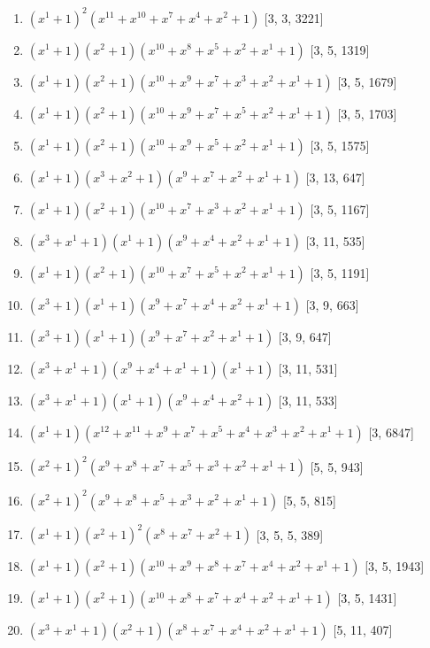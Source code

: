 \documentclass[10pt,twocolumn]{article}
\begin{document}
\begin{enumerate}
\item $(x^{1} + 1)^{2}(x^{11} + x^{10} + x^{7} + x^{4} + x^{2} + 1)$  [3, 3, 3221]
\item $(x^{1} + 1)(x^{2} + 1)(x^{10} + x^{8} + x^{5} + x^{2} + x^{1} + 1)$  [3, 5, 1319]
\item $(x^{1} + 1)(x^{2} + 1)(x^{10} + x^{9} + x^{7} + x^{3} + x^{2} + x^{1} + 1)$  [3, 5, 1679]
\item $(x^{1} + 1)(x^{2} + 1)(x^{10} + x^{9} + x^{7} + x^{5} + x^{2} + x^{1} + 1)$  [3, 5, 1703]
\item $(x^{1} + 1)(x^{2} + 1)(x^{10} + x^{9} + x^{5} + x^{2} + x^{1} + 1)$  [3, 5, 1575]
\item $(x^{1} + 1)(x^{3} + x^{2} + 1)(x^{9} + x^{7} + x^{2} + x^{1} + 1)$  [3, 13, 647]
\item $(x^{1} + 1)(x^{2} + 1)(x^{10} + x^{7} + x^{3} + x^{2} + x^{1} + 1)$  [3, 5, 1167]
\item $(x^{3} + x^{1} + 1)(x^{1} + 1)(x^{9} + x^{4} + x^{2} + x^{1} + 1)$  [3, 11, 535]
\item $(x^{1} + 1)(x^{2} + 1)(x^{10} + x^{7} + x^{5} + x^{2} + x^{1} + 1)$  [3, 5, 1191]
\item $(x^{3} + 1)(x^{1} + 1)(x^{9} + x^{7} + x^{4} + x^{2} + x^{1} + 1)$  [3, 9, 663]
\item $(x^{3} + 1)(x^{1} + 1)(x^{9} + x^{7} + x^{2} + x^{1} + 1)$  [3, 9, 647]
\item $(x^{3} + x^{1} + 1)(x^{9} + x^{4} + x^{1} + 1)(x^{1} + 1)$  [3, 11, 531]
\item $(x^{3} + x^{1} + 1)(x^{1} + 1)(x^{9} + x^{4} + x^{2} + 1)$  [3, 11, 533]
\item $(x^{1} + 1)(x^{12} + x^{11} + x^{9} + x^{7} + x^{5} + x^{4} + x^{3} + x^{2} + x^{1} + 1)$  [3, 6847]
\item $(x^{2} + 1)^{2}(x^{9} + x^{8} + x^{7} + x^{5} + x^{3} + x^{2} + x^{1} + 1)$  [5, 5, 943]
\item $(x^{2} + 1)^{2}(x^{9} + x^{8} + x^{5} + x^{3} + x^{2} + x^{1} + 1)$  [5, 5, 815]
\item $(x^{1} + 1)(x^{2} + 1)^{2}(x^{8} + x^{7} + x^{2} + 1)$  [3, 5, 5, 389]
\item $(x^{1} + 1)(x^{2} + 1)(x^{10} + x^{9} + x^{8} + x^{7} + x^{4} + x^{2} + x^{1} + 1)$  [3, 5, 1943]
\item $(x^{1} + 1)(x^{2} + 1)(x^{10} + x^{8} + x^{7} + x^{4} + x^{2} + x^{1} + 1)$  [3, 5, 1431]
\item $(x^{3} + x^{1} + 1)(x^{2} + 1)(x^{8} + x^{7} + x^{4} + x^{2} + x^{1} + 1)$  [5, 11, 407]

\end{enumerate}
\end{document}
